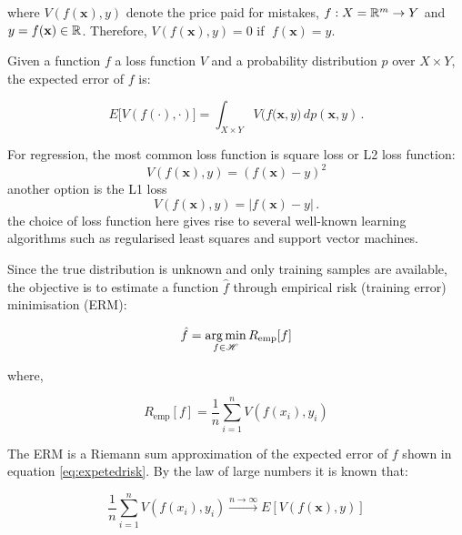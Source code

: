 \noindent where $V(f(\mathbf{x}),y)$ denote the price paid for mistakes, $f:X={\mathbb R }^m\to Y$
and $y=f(\mathbf{x})\in{\mathbb R }$. Therefore, $V(f(\mathbf{x}),y)=0$ if $\;f(\mathbf{x})=y$.

Given a function $f$ a loss function $V$ and a probability distribution $p$ over
$X \times Y$, the expected error of $f$ is:

\begin{equation}
\label{eq:expetedrisk}
E\big[ V( f(\cdot),\cdot) \big]
= \int_{X\times Y} V\big( f(\mathbf{x},y \big)\,dp(\mathbf{x},y)\,.
\end{equation}


For regression, the most common loss function is square loss or L2 loss function:
\begin{equation}
\label{eq:l2loss}
V(f(\mathbf{x}),y) = (f(\mathbf{x})-y)^2
\end{equation}
\noindent another option is the L1 loss
\begin{equation}
\label{eq:l1loss}
V(f(\mathbf{x}),y) = |f(\mathbf{x})-y| \, .
\end{equation}
\noindent the choice of loss function here gives rise to several well-known
learning algorithms such as regularised least squares and support vector
machines. %

Since the true distribution is unknown and only training samples are available,
the objective is to estimate a function $\hat{f}$ through empirical risk
(training error) minimisation (ERM): 

\begin{equation*}
\hat{f} = \operatorname*{arg\,min}_{f \in \mathscr{H}} R_{\text{emp}}[f] 
\end{equation*}

\noindent where, 

\begin{equation} 
\label{eq:erm}
R_{\text{emp}}[f] = \frac{1}{n} \sum_{i=1}^n V(f(x_i),y_i)   
\end{equation}

The ERM is a Riemann sum approximation of the expected error of $f$ shown in
equation \ref{eq:expetedrisk}. By the law of large numbers it is known that:

\begin{equation}
\frac{1}{n} \sum_{i=1}^n V(f(x_i),y_i) \xrightarrow{n \rightarrow \infty}  E[V(f(\mathbf{x}),y)]
\end{equation}


